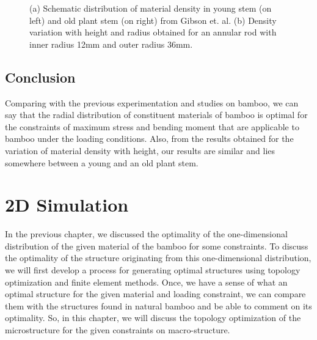 \documentclass[10pt]{article}
\begin{document}
\begin{figure}[H]
\begin{center}
{     }
	\label{fig:height}
	\caption{(a) Schematic distribution of material density in young stem (on left) and old plant stem (on right) from Gibson et. al. \cite{gibson1995mechanical} (b) Density variation with height and radius obtained for an annular rod with inner radius 12mm and outer radius 36mm.}
\end{center}
\end{figure}

\subsection{Conclusion}
Comparing with the previous experimentation and studies on bamboo, we can say that the radial distribution of constituent materials of bamboo is optimal for the constraints of maximum stress and bending moment that are applicable to bamboo under the loading conditions. Also, from the results obtained for the variation of material density with height, our results are similar and lies somewhere between a young and an old plant stem. 

\newpage
\section{2D Simulation}
In the previous chapter, we discussed the optimality of the one-dimensional distribution of the given material of the bamboo for some constraints. To discuss the optimality of the structure originating from this one-dimensional distribution, we will first develop a process for generating optimal structures using topology optimization and finite element methods. Once, we have a sense of what an optimal structure for the given material and loading constraint, we can compare them with the structures found in natural bamboo and be able to comment on its optimality. So, in this chapter, we will discuss the topology optimization of the microstructure for the given constraints on macro-structure.
\par
\end{document}
